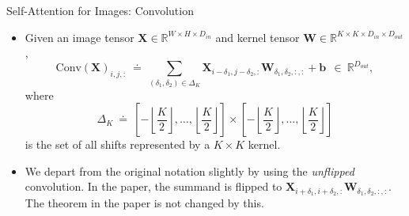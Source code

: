 \documentclass[9pt]{beamer}
\newcommand{\bb}{\mathbb}
\newcommand{\mb}{\bm}
\begin{document}
\newcommand{\sqbrkt}[1]{\left[#1\right]}
\newcommand{\ktwo}{\left\lfloor\frac K2\right\rfloor}
\begin{frame}{Self-Attention for Images: Convolution}
\begin{itemize}
\item Given an image tensor $\bm X \in \bb R^{W\times H\times D_{in}}$ and kernel tensor $\bm W \in \bb R^{K\times K \times D_{in} \times D_{out}}$,
\begin{equation}
\mathrm{Conv}(\mb X)_{i,j,:} \ \doteq \ \sum_{(\delta_1, \delta_2) \in \Delta_K} \mb X_{i-\delta_1, j-\delta_2, :} \mb W_{\delta_1, \delta_2, :, :} + \mb b \ \ \in \ \mathbb R^{D_{out}},
\end{equation}
where
$$\Delta_K \ \doteq \ \sqbrkt{-\ktwo, \dots, \ktwo} \times \sqbrkt{-\ktwo, \dots, \ktwo}$$
is the set of all shifts represented by a $K\times K$ kernel.

\vspace{.1in}
\item We depart from the original notation slightly by using the {\em unflipped} convolution. In the paper, the summand is flipped to $\bm X_{i+\delta_1, i+\delta_2,:} \bm W_{\delta_1, \delta_2,:,:}$. The theorem in the paper is not changed by this.
\end{itemize}
\end{frame}
\end{document}
